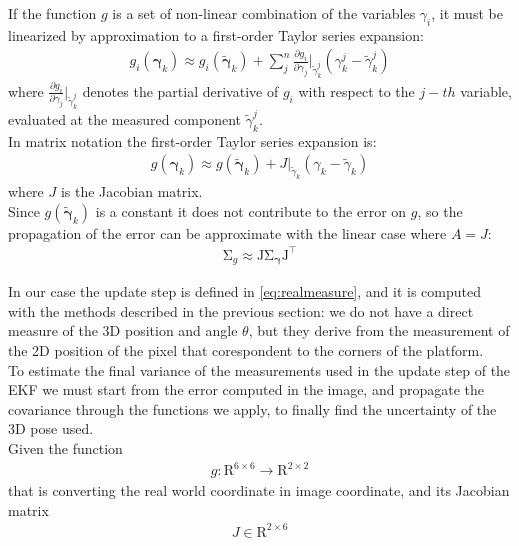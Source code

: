 If the function $g$ is a set of non-linear combination of the variables $\gamma_i$,  it must be linearized by approximation to a first-order Taylor series expansion:
\begin{align}
g_{i}(\boldsymbol{\gamma}_{k}) \approx g_{i}(\tilde{\boldsymbol{\gamma}}_{k})+\sum _{j}^{n}{\frac  {\partial g_{i}}{\partial {\gamma_{j}}}}\Big|_{\tilde{\gamma}_k^{j}}(\gamma_k^{j}-\tilde{\gamma}_k^{j})
\end{align}
where ${\frac  {\partial g_{i}}{\partial {\gamma_{j}}}}\Big|_{\tilde{\gamma}_k^{j}}$ denotes the partial derivative of $g_i$ with respect to the $j-th$ variable, evaluated at the measured component $\tilde{\gamma}_k^{j}$.\\
In matrix notation the first-order Taylor series expansion is:
\begin{align}
g(\boldsymbol{\gamma}_{k}) \approx g(\tilde{\boldsymbol{\gamma}}_{k})+J\Big|_{\tilde{\gamma}_k}(\gamma_k-\tilde{\gamma}_k)
\end{align}
where $J$ is the Jacobian matrix.\\
Since $g(\tilde{\boldsymbol{\gamma}}_{k})$ is a constant it does not contribute to the error on $g$, so the propagation of the error can be approximate with the linear case where $A = J$:
\begin{align}
{\displaystyle \mathrm {\Sigma }_g\approx \mathrm {J} \mathrm {\Sigma }_{\boldsymbol{\gamma}}\mathrm {J} ^{\top}} 
\label{eq:errorpropag}
\end{align}

In our case the update step is defined in \ref{eq:realmeasure}, and it is computed with the methods described in the previous section: we do not have a direct measure of the 3D position and angle $\theta$, but they derive from the measurement of the 2D position of the pixel that corespondent to the corners of the platform.\\
To estimate the final variance of the measurements used in the update step of the EKF we must start from the error computed in the image, and propagate the covariance through the functions we apply, to finally find the uncertainty of the 3D pose used.\\
Given the function
\begin{align}
g : \mathrm{R}^{6 \times 6} \to \mathrm{R}^{2 \times 2} 
\end{align}
that is converting the real world coordinate in image coordinate, and its Jacobian matrix 
\begin{align}
J \in \mathrm{R}^{2 \times 6} 
\end{align}

